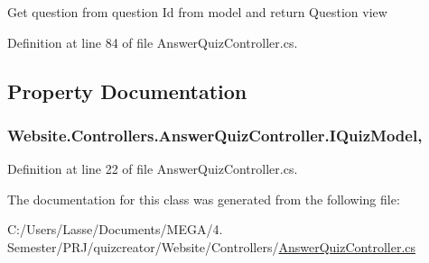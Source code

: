 Get question from question Id from model and return Question view 



Definition at line 84 of file Answer\+Quiz\+Controller.\+cs.



\subsection{Property Documentation}
\hypertarget{class_website_1_1_controllers_1_1_answer_quiz_controller_aa37e9bf6f0b76d7f16972ff3d2aba539}{}
\subsubsection[{I\+Quiz\+Model}]{ Website.\+Controllers.\+Answer\+Quiz\+Controller.\+I\+Quiz\+Model\hspace{0.3cm}{\ttfamily [get]}, {\ttfamily [set]}}\label{class_website_1_1_controllers_1_1_answer_quiz_controller_aa37e9bf6f0b76d7f16972ff3d2aba539}


Definition at line 22 of file Answer\+Quiz\+Controller.\+cs.



The documentation for this class was generated from the following file\+:\begin{DoxyCompactItemize}
\item 
C\+:/\+Users/\+Lasse/\+Documents/\+M\+E\+G\+A/4. Semester/\+P\+R\+J/quizcreator/\+Website/\+Controllers/\hyperlink{_answer_quiz_controller_8cs}{Answer\+Quiz\+Controller.\+cs}\end{DoxyCompactItemize}
